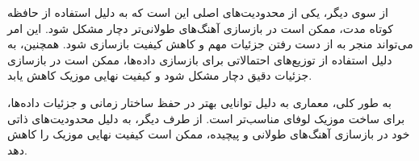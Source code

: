 از سوی دیگر، یکی از محدودیت‌های اصلی  این است که به دلیل استفاده از حافظه کوتاه مدت، ممکن است در بازسازی آهنگ‌های طولانی‌تر دچار مشکل شود. این امر می‌تواند منجر به از دست رفتن جزئیات مهم و کاهش کیفیت بازسازی شود. همچنین،  به دلیل استفاده از توزیع‌های احتمالاتی برای بازسازی داده‌ها، ممکن است در بازسازی جزئیات دقیق دچار مشکل شود و کیفیت نهایی موزیک کاهش یابد.

به طور کلی، معماری  به دلیل توانایی بهتر در حفظ ساختار زمانی و جزئیات داده‌ها، برای ساخت موزیک لوفای مناسب‌تر است. از طرف دیگر،  به دلیل محدودیت‌های ذاتی خود در بازسازی آهنگ‌های طولانی و پیچیده، ممکن است کیفیت نهایی موزیک را کاهش دهد.
